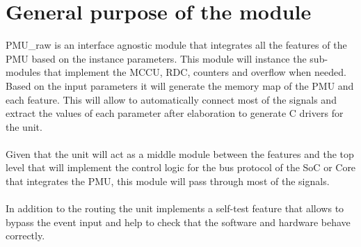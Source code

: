 \newpage
\section{General purpose of the module}
PMU\_raw is an interface agnostic module that integrates all the features of the PMU based on the instance parameters. This module will instance the sub-modules that implement the MCCU, RDC, counters and overflow when needed. Based on the input parameters it will generate the memory map of the PMU and each feature. This will allow to automatically connect most of the signals and extract the values of  each parameter after elaboration to generate C drivers for the unit.\\
\\
Given that the unit will act as a middle module between the features and the top level that will implement the control logic for the bus protocol of the SoC or Core that integrates the PMU, this module will pass through most of the signals.\\
\\
In addition to the routing the unit implements a self-test feature that allows to bypass the  event input and help to check that the software and hardware behave correctly.